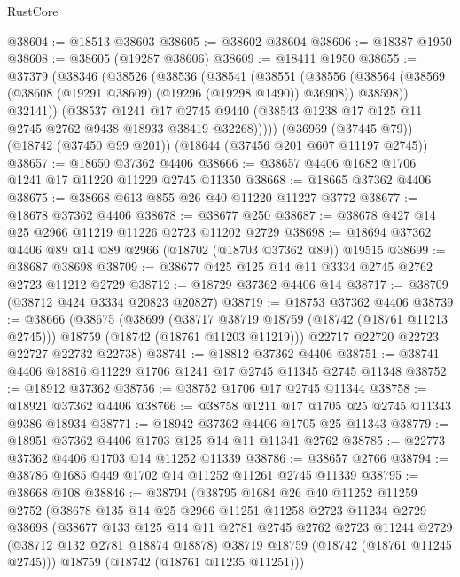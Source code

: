 \begin{lexlean}{RustCore}
\begin{coremodule}
@38604 := @18513 @38603
@38605 := @38602 @38604
@38606 := @18387 @1950
@38608 := @38605 (@19287 @38606)
@38609 := @18411 @1950
@38655 := @37379
    (@38346
      (@38526
        (@38536
          (@38541
            (@38551
              (@38556
                (@38564 (@38569 (@38608 (@19291 @38609) (@19296 (@19298 @1490)) @36908)) @38598))
              @32141))
          (@38537
            @1241
            @17
            @2745
            @9440
            (@38543 @1238 @17 @125 @11 @2745 @2762 @9438 @18933 @38419 @32268)))))
    (@36969 (@37445 @79))
    (@18742 (@37450 @99 @201))
    (@18644 (@37456 @201 @607 @11197 @2745))
@38657 := @18650 @37362 @4406
@38666 := @38657 @4406 @1682 @1706 @1241 @17 @11220 @11229 @2745 @11350
@38668 := @18665 @37362 @4406
@38675 := @38668 @613 @855 @26 @40 @11220 @11227 @3772
@38677 := @18678 @37362 @4406
@38678 := @38677 @250
@38687 := @38678 @427 @14 @25 @2966 @11219 @11226 @2723 @11202 @2729
@38698 := @18694 @37362 @4406 @89 @14 @89 @2966 (@18702 (@18703 @37362 @89)) @19515
@38699 := @38687 @38698
@38709 := @38677 @425 @125 @14 @11 @3334 @2745 @2762 @2723 @11212 @2729
@38712 := @18729 @37362 @4406 @14
@38717 := @38709 (@38712 @424 @3334 @20823 @20827)
@38719 := @18753 @37362 @4406
@38739 := @38666
    (@38675
      (@38699
        (@38717 @38719 @18759 (@18742 (@18761 @11213 @2745)))
        @18759
        (@18742 (@18761 @11203 @11219)))
      @22717
      @22720
      @22723
      @22727
      @22732
      @22738)
@38741 := @18812 @37362 @4406
@38751 := @38741 @4406 @18816 @11229 @1706 @1241 @17 @2745 @11345 @2745 @11348
@38752 := @18912 @37362
@38756 := @38752 @1706 @17 @2745 @11344
@38758 := @18921 @37362 @4406
@38766 := @38758 @1211 @17 @1705 @25 @2745 @11343 @9386 @18934
@38771 := @18942 @37362 @4406 @1705 @25 @11343
@38779 := @18951 @37362 @4406 @1703 @125 @14 @11 @11341 @2762
@38785 := @22773 @37362 @4406 @1703 @14 @11252 @11339
@38786 := @38657 @2766
@38794 := @38786 @1685 @449 @1702 @14 @11252 @11261 @2745 @11339
@38795 := @38668 @108
@38846 := @38794
    (@38795
      @1684
      @26
      @40
      @11252
      @11259
      @2752
      (@38678
        @135
        @14
        @25
        @2966
        @11251
        @11258
        @2723
        @11234
        @2729
        @38698
        (@38677
          @133
          @125
          @14
          @11
          @2781
          @2745
          @2762
          @2723
          @11244
          @2729
          (@38712 @132 @2781 @18874 @18878)
          @38719
          @18759
          (@18742 (@18761 @11245 @2745)))
        @18759
        (@18742 (@18761 @11235 @11251)))

\end{coremodule}
\end{lexlean}
